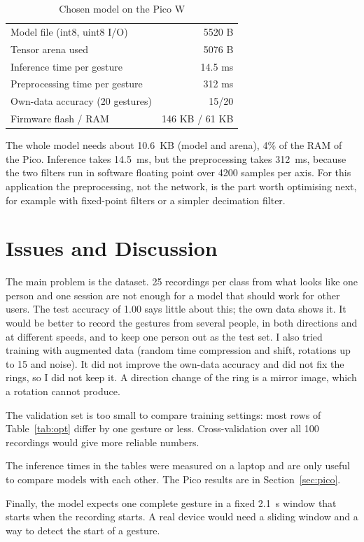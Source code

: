 \documentclass[conference]{IEEEtran}
\begin{document}
\begin{table}[h]
\caption{Chosen model on the Pico W}
\label{tab:pico}
\centering
\footnotesize
\begin{tabular}{lr}
\toprule
Model file (int8, uint8 I/O) & 5520 B \\
Tensor arena used            & 5076 B \\
Inference time per gesture   & 14.5 ms \\
Preprocessing time per gesture & 312 ms \\
Own-data accuracy (20 gestures) & 15/20 \\
Firmware flash / RAM         & 146 KB / 61 KB \\
\bottomrule
\end{tabular}
\end{table}

The whole model needs about 10.6~KB (model and arena), 4\% of the RAM of
the Pico. Inference takes 14.5~ms, but the preprocessing takes 312~ms,
because the two filters run in software floating point over 4200 samples
per axis. For this application the preprocessing, not the network, is the
part worth optimising next, for example with fixed-point filters or a
simpler decimation filter.

\section{Issues and Discussion}

The main problem is the dataset. 25 recordings per class from what looks
like one person and one session are not enough for a model that should work
for other users. The test accuracy of 1.00 says little about this; the own
data shows it. It would be better to record the gestures from several
people, in both directions and at different speeds, and to keep one person
out as the test set. I also tried training with augmented data (random time
compression and shift, rotations up to 15\textdegree{} and noise). It did
not improve the own-data accuracy and did not fix the rings, so I did not
keep it. A direction change of the ring is a mirror image, which a rotation
cannot produce.

The validation set is too small to compare training settings: most rows of
Table~\ref{tab:opt} differ by one gesture or less. Cross-validation over all
100 recordings would give more reliable numbers.

The inference times in the tables were measured on a laptop and are only
useful to compare models with each other. The Pico results are in
Section~\ref{sec:pico}.

Finally, the model expects one complete gesture in a fixed 2.1~s window
that starts when the recording starts. A real device would need a sliding
window and a way to detect the start of a gesture.
\end{document}
